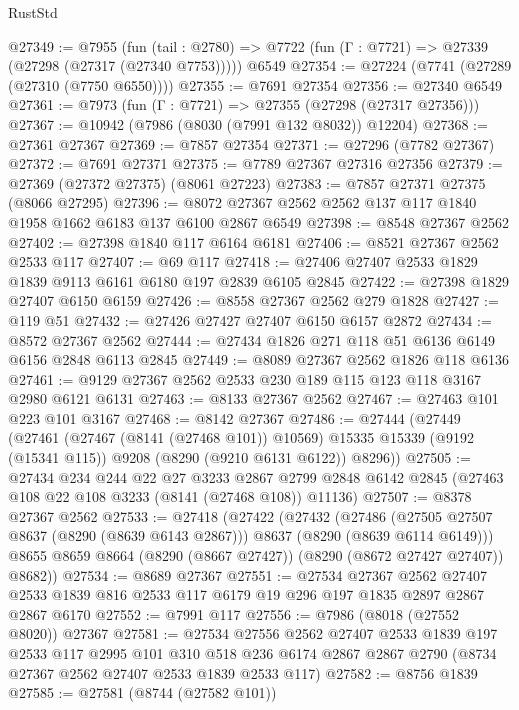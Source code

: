\begin{lexlean}{RustStd}
\begin{coremodule}
@27349 := @7955
    (fun (tail : @2780) => @7722 (fun (Γ : @7721) => @27339 (@27298 (@27317 (@27340 @7753)))))
    @6549
@27354 := @27224 (@7741 (@27289 (@27310 (@7750 @6550))))
@27355 := @7691 @27354
@27356 := @27340 @6549
@27361 := @7973 (fun (Γ : @7721) => @27355 (@27298 (@27317 @27356)))
@27367 := @10942 (@7986 (@8030 (@7991 @132 @8032)) @12204)
@27368 := @27361 @27367
@27369 := @7857 @27354
@27371 := @27296 (@7782 @27367)
@27372 := @7691 @27371
@27375 := @7789 @27367 @27316 @27356
@27379 := @27369 (@27372 @27375) (@8061 @27223)
@27383 := @7857 @27371 @27375 (@8066 @27295)
@27396 := @8072 @27367 @2562 @2562 @137 @117 @1840 @1958 @1662 @6183 @137 @6100 @2867 @6549
@27398 := @8548 @27367 @2562
@27402 := @27398 @1840 @117 @6164 @6181
@27406 := @8521 @27367 @2562 @2533 @117
@27407 := @69 @117
@27418 := @27406 @27407 @2533 @1829 @1839 @9113 @6161 @6180 @197 @2839 @6105 @2845
@27422 := @27398 @1829 @27407 @6150 @6159
@27426 := @8558 @27367 @2562 @279 @1828
@27427 := @119 @51
@27432 := @27426 @27427 @27407 @6150 @6157 @2872
@27434 := @8572 @27367 @2562
@27444 := @27434 @1826 @271 @118 @51 @6136 @6149 @6156 @2848 @6113 @2845
@27449 := @8089 @27367 @2562 @1826 @118 @6136
@27461 := @9129 @27367 @2562 @2533 @230 @189 @115 @123 @118 @3167 @2980 @6121 @6131
@27463 := @8133 @27367 @2562
@27467 := @27463 @101 @223 @101 @3167
@27468 := @8142 @27367
@27486 := @27444
    (@27449
      (@27461
        (@27467 (@8141 (@27468 @101)) @10569)
        @15335
        @15339
        (@9192 (@15341 @115))
        @9208
        (@8290 (@9210 @6131 @6122))
        @8296))
@27505 := @27434
    @234
    @244
    @22
    @27
    @3233
    @2867
    @2799
    @2848
    @6142
    @2845
    (@27463 @108 @22 @108 @3233 (@8141 (@27468 @108)) @11136)
@27507 := @8378 @27367 @2562
@27533 := @27418
    (@27422
      (@27432
        (@27486 (@27505 @27507 @8637 (@8290 (@8639 @6143 @2867))) @8637 (@8290 (@8639 @6114 @6149)))
        @8655
        @8659
        @8664
        (@8290 (@8667 @27427))
        (@8290 (@8672 @27427 @27407))
        @8682))
@27534 := @8689 @27367
@27551 := @27534
    @27367
    @2562
    @27407
    @2533
    @1839
    @816
    @2533
    @117
    @6179
    @19
    @296
    @197
    @1835
    @2897
    @2867
    @2867
    @6170
@27552 := @7991 @117
@27556 := @7986 (@8018 (@27552 @8020)) @27367
@27581 := @27534
    @27556
    @2562
    @27407
    @2533
    @1839
    @197
    @2533
    @117
    @2995
    @101
    @310
    @518
    @236
    @6174
    @2867
    @2867
    @2790
    (@8734 @27367 @2562 @27407 @2533 @1839 @2533 @117)
@27582 := @8756 @1839
@27585 := @27581 (@8744 (@27582 @101))

\end{coremodule}
\end{lexlean}
